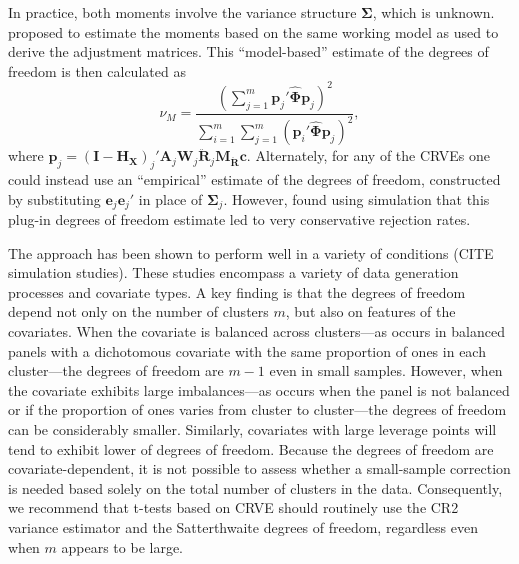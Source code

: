 \documentclass[12pt]{article}\usepackage[]{graphicx}\usepackage[]{color}
\newcommand{\bm}{\mathbf}
\newcommand{\bs}{\boldsymbol}
\begin{document}
In practice, both moments involve the variance structure $\bs\Sigma$, which is unknown. 
\citet{Bell2002bias} proposed to estimate the moments based on the same working model as used to derive the adjustment matrices. 
This ``model-based'' estimate of the degrees of freedom is then calculated as 
\begin{equation}
\nu_{M} = \frac{\left(\sum_{j=1}^m \bm{p}_j' \hat{\bs\Phi} \bm{p}_j\right)^2}{\sum_{i=1}^m \sum_{j=1}^m \left(\bm{p}_i' \hat{\bs\Phi} \bm{p}_j\right)^2},
\end{equation}
where $\bm{p}_j = \left(\bm{I} - \bm{H_X}\right)_j'\bm{A}_j \bm{W}_j\bm{\ddot{R}}_j\bm{M_{\ddot{R}}} \bm{c}$.\todo{Can we use $\bm{H_{\ddot{U}}}$ here instead?} 
Alternately, for any of the CRVEs one could instead use an ``empirical'' estimate of the degrees of freedom, constructed by substituting $\bm{e}_j \bm{e}_j'$ in place of $\bs\Sigma_j$. 
However, \citet{Bell2002bias} found using simulation that this plug-in degrees of freedom estimate led to very conservative rejection rates. 

The \citet{Bell2002bias} approach has been shown to perform well in a variety of conditions (CITE simulation studies). 
These studies encompass a variety of data generation processes and covariate types. 
A key finding is that the degrees of freedom depend not only on the number of clusters $m$, but also on features of the covariates. 
When the covariate is balanced across clusters---as occurs in balanced panels with a dichotomous covariate with the same proportion of ones in each cluster---the degrees of freedom are $m - 1$ even in small samples. 
However, when the covariate exhibits large imbalances---as occurs when the panel is not balanced or if the proportion of ones varies from cluster to cluster---the degrees of freedom can be considerably smaller. 
Similarly, covariates with large leverage points will tend to exhibit lower of degrees of freedom. 
Because the degrees of freedom are covariate-dependent, it is not possible to assess whether a small-sample correction is needed based solely on the total number of clusters in the data. 
Consequently, we recommend that t-tests based on CRVE should routinely use the CR2 variance estimator and the Satterthwaite degrees of freedom, regardless even when $m$ appears to be large.

\end{document}

